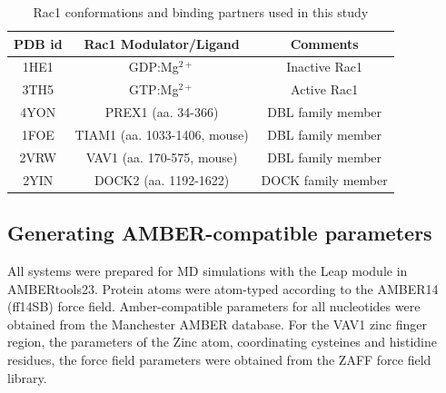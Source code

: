 \documentclass[12pt, a4paper]{achemso}
\begin{document}
\begin{table}
  \caption{Rac1 conformations and binding partners used in this study}
  \label{tbl:pdbs}
  \begin{tabular}{c c c}
    \hline
   \textbf{PDB id} & \textbf{Rac1 Modulator/Ligand} & \textbf{Comments} \\
    \hline
    1HE1\cite{gappdb} &  GDP:Mg$^{2+}$ & Inactive Rac1 \\
    3TH5\cite{activeRac1}   & GTP:Mg$^{2+}$ & Active Rac1 \\
    4YON\cite{prex1pdb} & PREX1 (aa. 34-366) &  DBL family member \\
    1FOE\cite{tiam1pdb} & TIAM1 (aa. 1033-1406, mouse) &  DBL family member \\
    2VRW\cite{vav1pdb} & VAV1 (aa. 170-575, mouse) & DBL family member \\
    2YIN\cite{dock2pdb} & DOCK2 (aa. 1192-1622) & DOCK family member \\
    \hline
  \end{tabular}
\end{table}


\subsection{Generating AMBER-compatible parameters} 
 All systems were prepared for MD simulations with the Leap module in AMBERtools23. Protein atoms were atom-typed according to the AMBER14 (ff14SB) force field\cite{ff14sb}.  Amber-compatible parameters for all nucleotides were obtained from the Manchester AMBER database\cite{meagher2003development}. For the VAV1 zinc finger region, the parameters of the Zinc atom, coordinating cysteines and histidine residues, the force field parameters were obtained from the ZAFF\cite{zaff} force field library.
\end{document}
